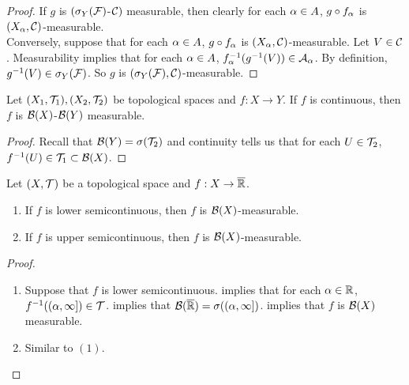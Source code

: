 \documentclass{book}
\begin{document}
	\begin{proof}
		If $g$ is $(\sigma_Y(\mathcal{F})$-$\mathcal{C})$ measurable, then clearly for each $\alpha \in A$, $g \circ f_{\alpha}$ is $(X_{\alpha}, \mathcal{C})$-measurable. \\
		Conversely, suppose that for each $\alpha \in A$, $g \circ f_{\alpha}$ is $(X_{\alpha}, \mathcal{C})$-measurable. Let $V \in \mathcal{C}$. Measurability implies that for each $\alpha \in A$, $f_{\alpha}^{-1}(g^{-1}(V)) \in \mathcal{A}_{\alpha}$. By definition, $g^{-1}(V) \in \sigma_Y(\mathcal{F})$. So $g$ is $(\sigma_Y(\mathcal{F}), \mathcal{C})$-measurable.
	\end{proof}
	
	\begin{ex} 
		Let $(X_1,\mathcal{T}_1), (X_2,\mathcal{T}_2)$ be topological spaces and $f: X \rightarrow Y$. If $f$ is continuous, then $f$ is $\mathcal{B}(X)$-$\mathcal{B}(Y)$ measurable.
	\end{ex}
	
	\begin{proof}
		Recall that $\mathcal{B}(Y) = \sigma(\mathcal{T}_2)$ and continuity tells us that for each $U \in \mathcal{T}_2$, $f^{-1}(U) \in \mathcal{T}_1 \subset \mathcal{B}(X)$. 
	\end{proof}

	\begin{ex} 
		Let $(X, \mathcal{T})$ be a topological space and $f:X \rightarrow \overline{\mathbb{R}}$. 
		\begin{enumerate}
			\item If $f$ is lower semicontinuous, then $f$ is $\mathcal{B}(X)$-measurable.
			\item If $f$ is upper semicontinuous, then $f$ is $\mathcal{B}(X)$-measurable.
		\end{enumerate}
	\end{ex}

	\begin{proof}\
		\begin{enumerate}
			\item Suppose that $f$ is lower semicontinuous.  implies that for each $\alpha \in \mathbb{R}$, $f^{-1}((\alpha, \infty]) \in \mathcal{T}$.   implies that $\mathcal{B}(\overline{\mathbb{R}}) = \sigma((\alpha, \infty])$.  implies that $f$ is $\mathcal{B}(X)$ measurable.
			\item Similar to $(1)$.
		\end{enumerate}
	\end{proof}

	\begin{ex} 
	\end{ex}
	
\end{document}
